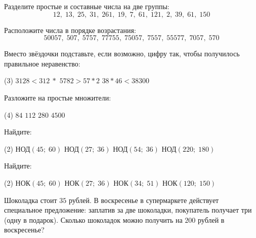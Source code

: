 \begin{class}[number=2]
	\begin{listofex}
	\item Разделите простые и составные числа на две группы:
	\[ 12,\;13,\;25,\;31,\;261,\;19,\;7,\;61,\;121,\;2,\;39,\;61,\;150 \]
	\item Расположите числа в порядке возрастания:
	\[ 50057,\;507,\;5757,\;77755,\;75057,\;7557,\;55577,\;7057,\;570 \]
	\item Вместо звёздочки подставьте, если возможно, цифру так, чтобы получилось правильное
	неравенство:
	\begin{tasks}(3)
		\task \( 3128 < 312\:* \)
		\task \( 5782 > 57*2 \)
		\task \( 38*46 < 38300 \)
	\end{tasks}
	\item Разложите на простые множители:
	\begin{tasks}(4)
		\task \( 84 \)
		\task \( 112 \)
		\task \( 280 \)
		\task \( 4500 \)
	\end{tasks}
	\item Найдите:
	\begin{tasks}(2)
		\task НОД\( (45;\;60) \)
		\task НОД\( (27;\;36) \)
		\task НОД\( (54;\;36) \)
		\task НОД\( (220;\;180) \)
	\end{tasks}
	\item Найдите:
	\begin{tasks}(2)
		\task НОК\( (45;\;60) \)
		\task НОК\( (27;\;36) \)
		\task НОК\( (34;\;51) \)
		\task НОК\( (120;\;150) \)
	\end{tasks}
	\item Шоколадка стоит \( 35 \) рублей. В воскресенье в супермаркете действует специальное
	предложение: заплатив за две шоколадки, покупатель получает три (одну в подарок). Сколько
	шоколадок можно получить на \( 200 \) рублей в воскресенье?
	\end{listofex}
\end{class}

